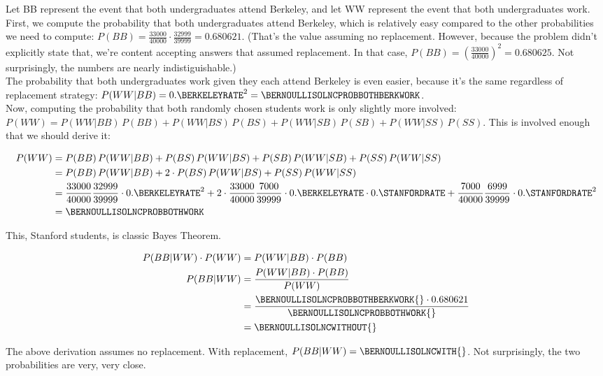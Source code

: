 Let BB represent the event that both undergraduates attend Berkeley, and let WW represent the event that both undergraduates work.
First, we compute the probability that both undergraduates attend Berkeley, which is relatively easy compared to the other probabilities we need to compute: $P(BB) = {\frac{33000}{40000} \cdot \frac{32999}{39999}} = 0.680621$. (That's the value assuming no replacement.  However, because the problem didn't explicitly state that, we're content accepting answers that assumed replacement.  In that case, $ P(BB) = {(\frac{33000}{40000})^{2}} = 0.680625$.  Not surprisingly, the numbers are nearly indistiguishable.) \\

The probability that both undergraduates work given they each attend Berkeley is even easier, because it's the same regardless of replacement strategy: $P(WW | BB) = {{0.\BERKELEYRATE}^{2}} = \BERNOULLISOLNCPROBBOTHBERKWORK$. \\ 

Now, computing the probability that both randomly chosen students work is only slightly more involved: $P(WW) = P(WW|BB)\,P(BB) + P(WW|BS)\,P(BS) + P(WW|SB)\,P(SB) + P(WW|SS)\,P(SS)$.  This is involved enough that we should derive it:

\begin{equation*}
\begin{split}
P(WW) &= P(BB)\,P(WW|BB) + P(BS)\,P(WW|BS) + P(SB)\,P(WW|SB) + P(SS)\,P(WW|SS) \\
      &= P(BB)\,P(WW|BB) + 2 \cdot P(BS)\,P(WW|BS) + P(SS)\,P(WW|SS) \\
      &= {\frac{33000}{40000} \frac{32999}{39999}} \cdot {{0.\BERKELEYRATE}^{2}} + 2 \cdot \frac{33000}{40000}\frac{7000}{39999} \cdot {0.\BERKELEYRATE} \cdot {0.\STANFORDRATE} + {\frac{7000}{40000}\frac{6999}{39999}} \cdot {{0.\STANFORDRATE}^{2}} \\
      &= \BERNOULLISOLNCPROBBOTHWORK
\end{split}    
\end{equation*}

This, Stanford students, is classic Bayes Theorem.

\begin{equation*}
\begin{split}
P(BB|WW) \cdot P(WW) &= P(WW|BB) \cdot P(BB) \\
P(BB|WW)  &= \frac{P(WW|BB) \cdot P(BB)}{P(WW)} \\
          &= \frac{\BERNOULLISOLNCPROBBOTHBERKWORK{} \cdot 0.680621}{\BERNOULLISOLNCPROBBOTHWORK{}} \\
          &= \BERNOULLISOLNCWITHOUT{}
\end{split}    
\end{equation*}

The above derivation assumes no replacement.  With replacement, $P(BB|WW) = \BERNOULLISOLNCWITH{}$.  Not surprisingly, the two probabilities are very, very close.